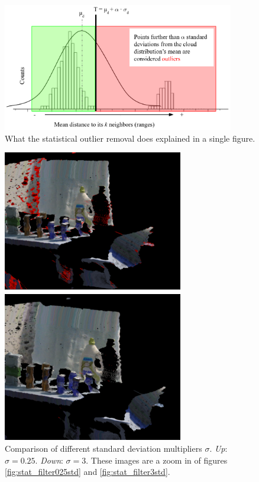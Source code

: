 \documentclass[../main.tex]{subfiles}
\begin{document}
\begin{figure}[htbp]
    \centering
    \includegraphics[width=0.9\textwidth]{images/stat_filter_diagram.png}
    \caption{What the statistical outlier removal does explained in a single figure.}
    \label{fig:stat_filter_diagram}
\end{figure}

\begin{figure}[htbp]
    \centering
    \includegraphics[width=0.7\textwidth]{images/stat_filtered_compareStds.png}
    \caption{Comparison of different standard deviation multipliers $\sigma$. \emph{Up}: $\sigma=0.25$. \emph{Down}: $\sigma=3$. These images are a zoom in of figures \ref{fig:stat_filter025std} and \ref{fig:stat_filter3std}.}
    \label{fig:stat_filtered_compareStds}
\end{figure}
\end{document}
